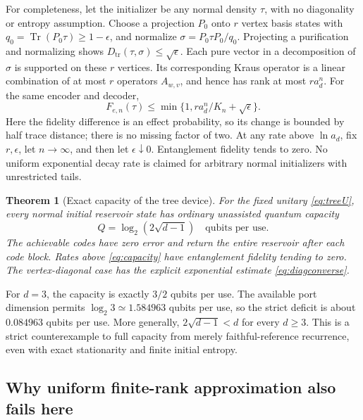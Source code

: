 \documentclass[11pt]{article}
\newtheorem{theorem}{Theorem}[section]
\theoremstyle{definition}\newtheorem{definition}[theorem]{Definition}
\newcommand{\Tr}{\operatorname{Tr}}
\newcommand{\D}{D_{\mathrm{tr}}}
\begin{document}
For completeness, let the initializer be any normal density $\tau$, with no diagonality or entropy assumption. Choose a projection $P_0$ onto $r$ vertex basis states with $q_0=\Tr(P_0\tau)\ge1-\epsilon$, and normalize $\sigma=P_0\tau P_0/q_0$. Projecting a purification and normalizing shows $\D(\tau,\sigma)\le\sqrt\epsilon$. Each pure vector in a decomposition of $\sigma$ is supported on these $r$ vertices. Its corresponding Kraus operator is a linear combination of at most $r$ operators $A_{w,v}$, and hence has rank at most $r a_d^n$. For the same encoder and decoder,
\begin{equation}
 F_{e,n}(\tau)\le\min\{1,r a_d^n/K_n+\sqrt\epsilon\}.
 \label{eq:normalconverse}
\end{equation}
Here the fidelity difference is an effect probability, so its change is bounded by half trace distance; there is no missing factor of two. At any rate above $\ln a_d$, fix $r,\epsilon$, let $n\to\infty$, and then let $\epsilon\downarrow0$. Entanglement fidelity tends to zero. No uniform exponential decay rate is claimed for arbitrary normal initializers with unrestricted tails.

\begin{theorem}[Exact capacity of the tree device]\label{thm:treecapacity}
For the fixed unitary \eqref{eq:treeU}, every normal initial reservoir state has ordinary unassisted quantum capacity
\begin{equation}
 Q=\log_2(2\sqrt{d-1})\quad\text{qubits per use}.\label{eq:capacity}
\end{equation}
The achievable codes have zero error and return the entire reservoir after each code block. Rates above \eqref{eq:capacity} have entanglement fidelity tending to zero. The vertex-diagonal case has the explicit exponential estimate \eqref{eq:diagconverse}.
\end{theorem}

For $d=3$, the capacity is exactly $3/2$ qubits per use. The available port dimension permits $\log_2 3\simeq1.584963$ qubits per use, so the strict deficit is about $0.084963$ qubits per use. More generally, $2\sqrt{d-1}<d$ for every $d\ge3$. This is a strict counterexample to full capacity from merely faithful-reference recurrence, even with exact stationarity and finite initial entropy.

\subsection{Why uniform finite-rank approximation also fails here}
\end{document}
